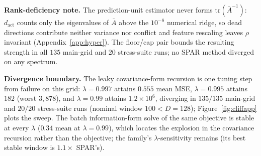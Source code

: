 \textbf{Rank-deficiency note.}
The prediction-unit estimator never forms $\mathrm{tr}(\bar A^{-1})$: $d_{\mathrm{act}}$ counts only the eigenvalues of $\bar A$ above the $10^{-8}$ numerical ridge, so dead directions contribute neither variance nor conflict and feature rescaling leaves $\rho$ invariant (Appendix~\ref{app:hyper}).
The floor/cap pair bounds the resulting strength in all $135$ main-grid and $20$ stress-suite runs; no SPAR method diverged on any spectrum.

\textbf{Divergence boundary.}
The leaky covariance-form recursion is one tuning step from failure on this grid: $\lambda = 0.997$ attains $0.555$ mean MSE, $\lambda = 0.995$ attains $182$ (worst $3{,}878$), and $\lambda = 0.99$ attains $1.2 \times 10^6$, diverging in $135/135$ main-grid and $20/20$ stress-suite runs (nominal window $100 < D = 128$); Figure~\ref{fig:cliffapp} plots the sweep.
The batch information-form solve of the same objective is stable at every $\lambda$ ($0.34$ mean at $\lambda = 0.99$), which locates the explosion in the covariance recursion rather than the objective; the family's $\lambda$-sensitivity remains (its best stable window is $1.1\times$ SPAR's).

